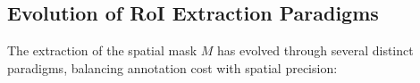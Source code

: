 
\subsection{Evolution of RoI Extraction Paradigms}

The extraction of the spatial mask $M$ has evolved through several distinct paradigms, balancing annotation cost with spatial precision:

